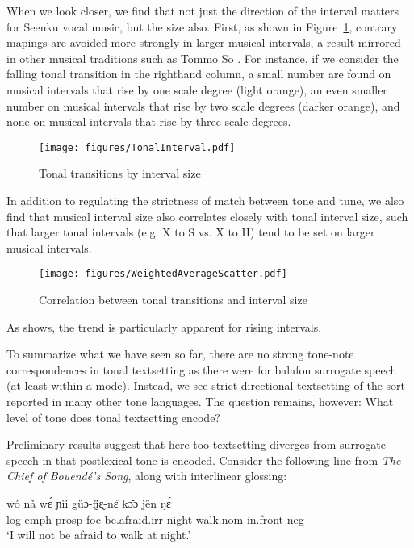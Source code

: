 \documentclass[output=paper]{langscibook}
\begin{document}
When we look closer, we find that not just the direction of the interval matters for Seenku vocal music, but the size also. First, as shown in Figure~\ref{fig:transitions:size}, contrary mapings are avoided more strongly in larger musical intervals, a result mirrored in other musical traditions such as Tommo So \citep{McPhersonRyan2018}. For instance, if we consider the falling tonal transition in the righthand column, a small number are found on musical intervals that rise by one scale degree (light orange), an even smaller number on musical intervals that rise by two scale degrees (darker orange), and none on musical intervals that rise by three scale degrees.

\begin{figure}[p]
  \texttt{[image: figures/TonalInterval.pdf]}
  \caption{Tonal transitions by interval size\label{fig:transitions:size}}
\end{figure}

In addition to regulating the strictness of match between tone and tune, we also find that musical interval size also correlates closely with tonal interval size, such that larger tonal intervals (e.g. X to S vs. X to H) tend to be set on larger musical intervals. 

\begin{figure}
  \texttt{[image: figures/WeightedAverageScatter.pdf]}
  \caption{Correlation between tonal transitions and interval size\label{fig:mcpherson:WeightedAverageScatter}}
\end{figure}

As  shows, the trend is particularly apparent for rising intervals. 

To summarize what we have seen so far, there are no strong tone-note correspondences in tonal textsetting as there were for balafon surrogate speech (at least within a mode). Instead, we see strict directional textsetting of the sort reported in many other tone languages. The question remains, however: What level of tone does tonal textsetting encode? 

Preliminary results suggest that here too textsetting diverges from surrogate speech in that postlexical tone is encoded. Consider the following line from \textit{The Chief of Bouendé's Song}, along with interlinear glossing:

\ea\label{lyrics1} 
 {wó} {nǎ} {wɛ́} {ɲìi} {gȕɔ-fḭ̋ɛ̰-nɛ̋} {kɔ̌ɔ} {je̋n} {ŋɛ́} \\
{\sc log} {\sc emph} {\sc prosp} {\sc foc} be.afraid.{\sc irr} night walk.{\sc nom} in.front {\sc neg} \\
\glt `I will not be afraid to walk at night.'
\z 
\end{document}
